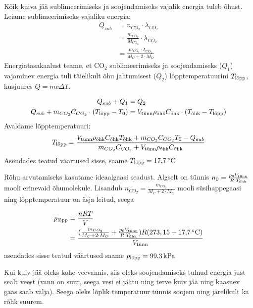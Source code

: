 \documentclass[10pt]{article}
\begin{document}

\solu
Kõik kuiva jää sublimeerimiseks ja soojendamiseks vajalik energia tuleb õhust. Leiame sublimeerimiseks vajaliku energia:
\begin{align*}
    Q_{sub} &= n_{CO_2} \cdot \lambda_{CO_2}\\
    &= \frac{m_{CO_2}}{M_{CO_2}} \cdot \lambda_{CO_2}\\
    &= \frac{m_{CO_2}\cdot \lambda_{CO_2}}{M_{C} + 2\cdot M_{O}}
\end{align*}
Energiatasakaalust teame, et CO\(_2\) sublimeerimiseks ja soojendamiseks (\(Q_1\)) vajaminev energia tuli täielikult õhu jahtumisest (\(Q_2\)) lõpptemperatuurini \(T_{\textup{lõpp}}\), kusjuures \(Q = mc\Delta T\).

\begin{align*}
    Q_{sub} + Q_1 &= Q_2 \\
    Q_{sub} + m_{CO_2}C_{CO_{2}}\cdot(T_{\textup{lõpp}}-T_{0}) &= V_{\textup{tünn}}\rho_{\textup{õhk}}C_{\textup{õhk}}\cdot(T_{\textup{õhk}}-T_{\textup{lõpp}})\\
\end{align*}
Avaldame lõpptemperatuuri:
\begin{equation*}
    T_{\textup{lõpp}} = \frac{V_{\textup{tünn}}\rho_{\textup{õhk}}C_{\textup{õhk}}T_{\textup{õhk}}+m_{CO_2}C_{CO_{2}}T_{0}-Q_{sub}}{m_{CO_2}C_{CO_{2}}+V_{\textup{tünn}}\rho_{\textup{õhk}}C_{\textup{õhk}}}
\end{equation*}
Asendades teatud väärtused sisse, saame \(T_{\textup{lõpp}} = \SI{17,7}{\degreeCelsius}\) 

Rõhu arvutamiseks kasutame ideaalgaasi seadust. Algselt on tünnis \(n_0 =\frac{p_0V_{\textup{tünn}}}{R\cdot T_{\textup{õhk}}}\) mooli erinevaid õhumolekule. Lisandub \(n_{CO_2} = \frac{m_{CO_2}}{M_{C} + 2\cdot M_{O}}\) mooli süsihappegaasi ning lõpptemperatuur on äsja leitud, seega

\begin{align*}
    p_{\textup{lõpp}} &= \frac{nRT}{V}\\
    &=\frac{(\frac{m_{CO_2}}{M_{C} + 2\cdot M_{O}}+\frac{p_0V_{\textup{tünn}}}{R\cdot T_{\textup{õhk}}})R(273,15 + \SI{17,7}{\degreeCelsius})}{V_{\textup{tünn}}}
\end{align*}
asendades sisse teatud väärtused saame \(p_{\textup{lõpp}} = \SI{99.3}{\kilo\pascal}\)

Kui kuiv jää oleks kohe veevannis, siis oleks soojendamiseks tulnud energia just sealt veest (vann on suur, seega vesi ei jäätu ning terve kuiv jää ning kaasnev gaas saab välja). Seega oleks lõplik temperatuur tünnis soojem ning järelikult ka rõhk suurem.
\probend
\bigskip
\end{document}
